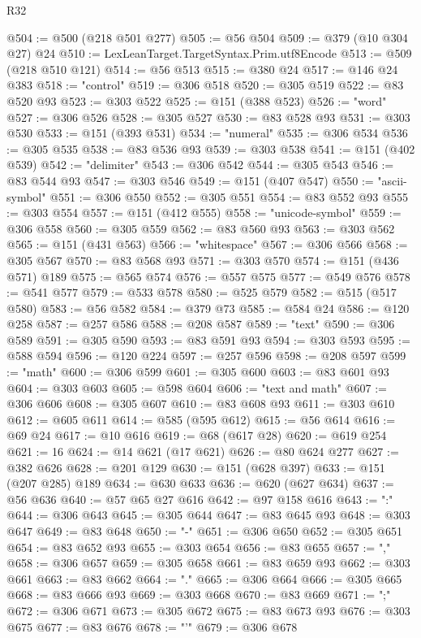 \begin{lexlean}{R32}
\begin{coremodule}
@504 := @500 (@218 @501 @277)
@505 := @56 @504
@509 := @379 (@10 @304 @27) @24
@510 := LexLeanTarget.TargetSyntax.Prim.utf8Encode
@513 := @509 (@218 @510 @121)
@514 := @56 @513
@515 := @380 @24
@517 := @146 @24 @383
@518 := "control"
@519 := @306 @518
@520 := @305 @519
@522 := @83 @520 @93
@523 := @303 @522
@525 := @151 (@388 @523)
@526 := "word"
@527 := @306 @526
@528 := @305 @527
@530 := @83 @528 @93
@531 := @303 @530
@533 := @151 (@393 @531)
@534 := "numeral"
@535 := @306 @534
@536 := @305 @535
@538 := @83 @536 @93
@539 := @303 @538
@541 := @151 (@402 @539)
@542 := "delimiter"
@543 := @306 @542
@544 := @305 @543
@546 := @83 @544 @93
@547 := @303 @546
@549 := @151 (@407 @547)
@550 := "ascii-symbol"
@551 := @306 @550
@552 := @305 @551
@554 := @83 @552 @93
@555 := @303 @554
@557 := @151 (@412 @555)
@558 := "unicode-symbol"
@559 := @306 @558
@560 := @305 @559
@562 := @83 @560 @93
@563 := @303 @562
@565 := @151 (@431 @563)
@566 := "whitespace"
@567 := @306 @566
@568 := @305 @567
@570 := @83 @568 @93
@571 := @303 @570
@574 := @151 (@436 @571) @189
@575 := @565 @574
@576 := @557 @575
@577 := @549 @576
@578 := @541 @577
@579 := @533 @578
@580 := @525 @579
@582 := @515 (@517 @580)
@583 := @56 @582
@584 := @379 @73
@585 := @584 @24
@586 := @120 @258
@587 := @257 @586
@588 := @208 @587
@589 := "text"
@590 := @306 @589
@591 := @305 @590
@593 := @83 @591 @93
@594 := @303 @593
@595 := @588 @594
@596 := @120 @224
@597 := @257 @596
@598 := @208 @597
@599 := "math"
@600 := @306 @599
@601 := @305 @600
@603 := @83 @601 @93
@604 := @303 @603
@605 := @598 @604
@606 := "text and math"
@607 := @306 @606
@608 := @305 @607
@610 := @83 @608 @93
@611 := @303 @610
@612 := @605 @611
@614 := @585 (@595 @612)
@615 := @56 @614
@616 := @69 @24
@617 := @10 @616
@619 := @68 (@617 @28)
@620 := @619 @254
@621 := 16
@624 := @14 @621 (@17 @621)
@626 := @80 @624 @277
@627 := @382 @626
@628 := @201 @129
@630 := @151 (@628 @397)
@633 := @151 (@207 @285) @189
@634 := @630 @633
@636 := @620 (@627 @634)
@637 := @56 @636
@640 := @57 @65 @27 @616
@642 := @97 @158 @616
@643 := ":"
@644 := @306 @643
@645 := @305 @644
@647 := @83 @645 @93
@648 := @303 @647
@649 := @83 @648
@650 := "-"
@651 := @306 @650
@652 := @305 @651
@654 := @83 @652 @93
@655 := @303 @654
@656 := @83 @655
@657 := ","
@658 := @306 @657
@659 := @305 @658
@661 := @83 @659 @93
@662 := @303 @661
@663 := @83 @662
@664 := "."
@665 := @306 @664
@666 := @305 @665
@668 := @83 @666 @93
@669 := @303 @668
@670 := @83 @669
@671 := ";"
@672 := @306 @671
@673 := @305 @672
@675 := @83 @673 @93
@676 := @303 @675
@677 := @83 @676
@678 := "'"
@679 := @306 @678

\end{coremodule}
\end{lexlean}
